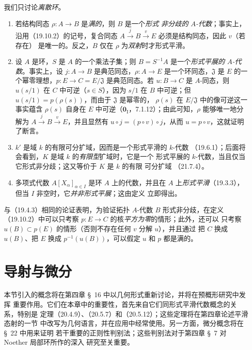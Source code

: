 \begin{examples}[19.10.3]
\label{0.19.10.3-fr}
我们只讨论\emph{离散环}。
\begin{enumerate}
  \item[(i)] 若结构同态 $\rho:A\to B$ 是\emph{满的}，则 $B$ 是一个\emph{形式
  非分歧的 $A$-代数}；事实上，沿用（19.10.2）的记号，复合同态
  $A\xrightarrow{j}B\xrightarrow{v}E$ 必须是结构同态，因此 $v$（若存在）
  是唯一的。反之，$B$ 仅在 $\rho$ 为\emph{双射}时才形式平滑。
  \item[(ii)] 设 $A$ 是环，$S$ 是 $A$ 的一个乘法子集；则
  $B=S^{-1}A$ 是一个\emph{形式平展的 $A$-代数}。事实上，设
  $j:A\to B$ 是典范同态，$\rho:A\to E$ 是一个环同态，$\mathfrak J$ 是 $E$
  的一个幂零理想，$p:E\to C=E/\mathfrak J$ 是典范同态。若 $u:B\to C$ 是
  $A$-同态，则 $u(s/1)$ 在 $C$ 中可逆（$s\in S$），因为 $s/1$ 在 $B$
  中可逆；但 $u(s/1)=p(\rho(s))$，而由于 $\mathfrak J$ 是幂零的，
  $\rho(s)$ 在 $E/\mathfrak J$ 中的像可逆这一事实蕴含 $\rho(s)$ 自身在 $E$
  中可逆（$\mathbf 0_{\mathrm I}$，7.1.12）；由此可知，$\rho$ 能够唯一地分解为
  $A\xrightarrow{j}B\xrightarrow{v}E$，并且显然有
  $u\circ j=(p\circ v)\circ j$，从而 $u=p\circ v$，这就证明了断言。
  \item[(iii)] $k'$ 是域 $k$ 的有限可分扩域，因而是一个形式平滑的 $k$-代数
  （19.6.1）；后面将会看到，$K$ 是域 $k$ 的\emph{有限型}扩域时，它是一个
  形式平展的 $k$-代数，当且仅当它形式非分歧；这又等价于 $K$ 是 $k$ 的有限
  可分扩域
  （21.7.4）。
  \item[(iv)] 多项式代数 $A[X_\alpha]_{\alpha\in I}$ 是环 $A$ 上的代数，并且在
  $A$ 上\emph{形式平滑}（19.3.3），但当 $I$ 非空时，它\emph{并非形式平展}；这由定义
  立即得出。
\end{enumerate}
\end{examples}

\begin{remark}[19.10.4]
\label{0.19.10.4-fr}
与（19.4.3）相同的论证表明，为验证拓扑 $A$-代数 $B$ 形式非分歧，在定义
（19.10.2）中可以只考察 $p:E\to C$ 的核\emph{平方为零}的情形；此外，还可以
只考察 $u(B)\subset p(E)$ 的情形（否则不存在任何 $v$ 分解 $u$），并且通过
把 $C$ 换成 $u(B)$、把 $E$ 换成 $p^{-1}(u(B))$，可以假定 $u$ 和 $p$ 都是满的。
\end{remark}

\section{导射与微分}
\label{section:0.20-fr}
\label{0.20-fr}

本节引入的概念将在第四章 §~16 中以几何形式重新讨论，并将在预概形研究中发挥
重要作用。它们在本章中的重要性，首先来自它们同形式平滑代数概念的关系，特别是
定理（20.4.9）、（20.5.7）和（20.5.12）；这些定理将在第四章论述平滑态射的一节
中改写为几何语言，并在应用中经常使用。另一方面，微分概念将在 §~22 中用来证明
若干重要的正则性判别法；这些判别法对于第四章 §~7 对 Noether 局部环所作的深入
研究至关重要。

